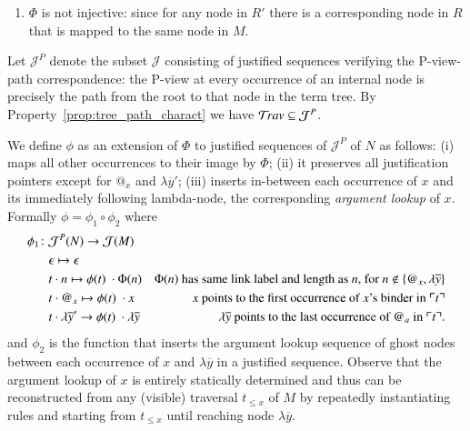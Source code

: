 \documentclass{elsarticle}
\theoremstyle{plain}
\theoremstyle{definition}
\def\justseqset{\mathcal{J}}
\begin{document}
\begin{description}[itemindent=0em,leftmargin=0cm]
\begin{enumerate}[label=(\roman*)]
    \item $\Phi$ is not injective: since for any node in $R'$ there is a corresponding node in $R$ that is mapped to the same node in $M$.
\end{enumerate}

Let $\justseqset^P$ denote the subset $\justseqset$
consisting of justified sequences verifying the P-view-path correspondence:
the P-view at every occurrence of an internal node is precisely the path from the root to that node in the term tree. By Property~\ref{prop:tree_path_charact} we have $\travset \subseteq \justseqset^P$.

We define $\phi$ as an extension of $\Phi$ to justified sequences of $\justseqset^P$ of $N$ as follows:
(i) maps all other occurrences to their image by $\Phi$;
(ii) it preserves all justification pointers except for $@_x$ and $\lambda\overline{y}'$;
(iii) inserts in-between each occurrence of $x$ and its immediately following lambda-node, the corresponding \emph{argument lookup} of $x$. Formally $\phi = \phi_1 \circ \phi_2$ where
\begin{align*}
\phi_1 \colon & \justseqset^P(N) \rightarrow \justseqset(M) \\
& \epsilon \mapsto \epsilon  \\
& t \cdot n \mapsto \phi(t) \ \cdot \Phi(n) &\mbox{$\Phi(n)$ has same link label and length as $n$, for $n\not\in \{ @_x, \lambda\overline{y} \}$}\\
 & t \cdot @_x \mapsto \phi(t) \ \cdot x &\mbox{$x$ points to the first occurrence of $x$'s binder in $\pview{t}$} \\
& t \cdot \lambda\overline{y}' \rightarrow \phi(t) \ \cdot \lambda\overline{y} &\mbox{$\lambda\overline{y}$ points to the last occurrence of $@_a$ in $\pview{t}$.}
\end{align*}
and $\phi_2$ is the function that inserts the argument lookup sequence of ghost nodes between each occurrence of $x$ and $\lambda\overline{y}$ in a justified sequence. Observe that the argument lookup of $x$ is entirely statically determined and thus can be reconstructed from any (visible) traversal $t_{\leq x}$ of $M$ by repeatedly instantiating rules  and  starting from $t_{\leq x}$ until reaching node $\lambda\overline{y}$.


\end{description}
\end{document}
